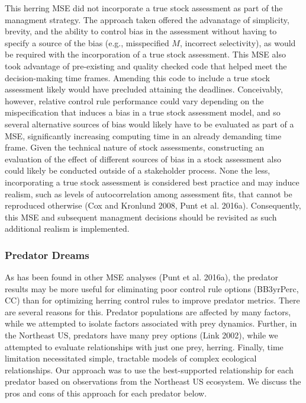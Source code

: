 \documentclass[]{article}
\begin{document}
This herring MSE did not incorporate a true stock assessment as part of
the managment strategy. The approach taken offered the advanatage of
simplicity, brevity, and the ability to control bias in the assessment
without having to specify a source of the bias (e.g., misspecified
\(M\), incorrect selectivity), as would be required with the
incorporation of a true stock assessment. This MSE also took advantage
of pre-existing and quality checked code that helped meet the
decision-making time frames. Amending this code to include a true stock
assessment likely would have precluded attaining the deadlines.
Conceivably, however, relative control rule performance could vary
depending on the mispecification that induces a bias in a true stock
assessment model, and so several alternative sources of bias would
likely have to be evaluated as part of a MSE, significantly increasing
computing time in an already demanding time frame. Given the technical
nature of stock assessments, constructing an evaluation of the effect of
different sources of bias in a stock assessment also could likely be
conducted outside of a stakeholder process. None the less, incorporating
a true stock assessment is considered best practice and may induce
realism, such as levels of autocorrelation among assessment fits, that
cannot be reproduced otherwise (Cox and Kronlund 2008, Punt et al.
2016a). Consequently, this MSE and subsequent managment decisions should
be revisited as such additional realism is implemented.

\subsubsection{Predator Dreams}\label{predator-dreams}

As has been found in other MSE analyses (Punt et al. 2016a), the
predator results may be more useful for eliminating poor control rule
options (BB3yrPerc, CC) than for optimizing herring control rules to
improve predator metrics. There are several reasons for this. Predator
populations are affected by many factors, while we attempted to isolate
factors associated with prey dynamics. Further, in the Northeast US,
predators have many prey options (Link 2002), while we attempted to
evaluate relationships with just one prey, herring. Finally, time
limitation necessitated simple, tractable models of complex ecological
relationships. Our approach was to use the best-supported relationship
for each predator based on observations from the Northeast US ecosystem.
We discuss the pros and cons of this approach for each predator below.
\end{document}
